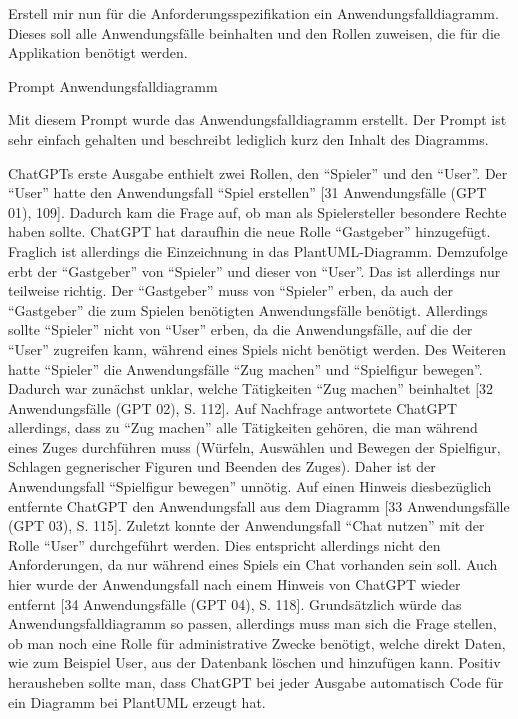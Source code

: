 \begin{prompt}[H]
    \begin{tcolorbox}[colback=gray!20, colframe=gray!20, boxrule=0pt, sharp corners] 
        Erstell mir nun für die Anforderungsspezifikation ein Anwendungsfalldiagramm. Dieses soll alle Anwendungsfälle beinhalten und den Rollen zuweisen, die für die 
        Applikation benötigt werden.
        \vfill
    \end{tcolorbox}
    \caption{Prompt Anwendungsfalldiagramm}
    \label{Prompt Anwendungsfalldiagramm}
\end{prompt}

Mit diesem Prompt wurde das Anwendungsfalldiagramm erstellt. Der Prompt ist sehr einfach gehalten und beschreibt lediglich kurz den Inhalt des Diagramms.

ChatGPTs erste Ausgabe enthielt zwei Rollen, den ``Spieler'' und den ``User''. Der ``User'' hatte den Anwendungsfall ``Spiel erstellen'' 
[31 Anwendungsfälle (GPT 01), 109]. Dadurch kam die Frage auf, ob man als Spielersteller besondere Rechte haben sollte. ChatGPT hat 
daraufhin die neue Rolle ``Gastgeber'' hinzugefügt. Fraglich ist allerdings die Einzeichnung in das PlantUML-Diagramm. Demzufolge erbt der 
``Gastgeber'' von ``Spieler'' und dieser von ``User''. Das ist allerdings nur teilweise richtig. Der ``Gastgeber'' muss von ``Spieler'' erben, 
da auch der ``Gastgeber'' die zum Spielen benötigten Anwendungsfälle benötigt. Allerdings sollte ``Spieler'' nicht von ``User'' erben, da 
die Anwendungsfälle, auf die der ``User'' zugreifen kann, während eines Spiels nicht benötigt werden. Des Weiteren hatte ``Spieler'' die 
Anwendungsfälle ``Zug machen'' und ``Spielfigur bewegen''. Dadurch war zunächst unklar, welche Tätigkeiten ``Zug machen'' beinhaltet 
[32 Anwendungsfälle (GPT 02), S. 112]. Auf Nachfrage antwortete ChatGPT allerdings, dass zu ``Zug machen'' alle Tätigkeiten gehören, die man 
während eines Zuges durchführen muss (Würfeln, Auswählen und Bewegen der Spielfigur, Schlagen gegnerischer Figuren und Beenden des Zuges). 
Daher ist der Anwendungsfall ``Spielfigur bewegen'' unnötig. Auf einen Hinweis diesbezüglich entfernte ChatGPT den Anwendungsfall aus dem 
Diagramm [33 Anwendungsfälle (GPT 03), S. 115]. Zuletzt konnte der Anwendungsfall ``Chat nutzen'' mit der Rolle ``User'' durchgeführt 
werden. Dies entspricht allerdings nicht den Anforderungen, da nur während eines Spiels ein Chat vorhanden sein soll. Auch hier wurde 
der Anwendungsfall nach einem Hinweis von ChatGPT wieder entfernt [34 Anwendungsfälle (GPT 04), S. 118]. Grundsätzlich würde das 
Anwendungsfalldiagramm so passen, allerdings muss man sich die Frage stellen, ob man noch eine Rolle für administrative Zwecke benötigt, 
welche direkt Daten, wie zum Beispiel User, aus der Datenbank löschen und hinzufügen kann. Positiv herausheben sollte man, dass ChatGPT 
bei jeder Ausgabe automatisch Code für ein Diagramm bei PlantUML erzeugt hat.

